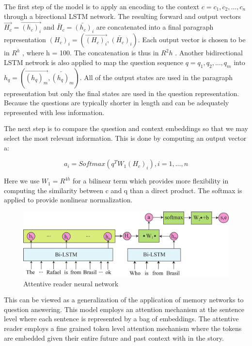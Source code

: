 \documentclass{article}
\begin{document}
The first step of the model is to apply an encoding
to the context $ c = {c_1 , c_2 , ..., c_n }$ through a birectional LSTM network. The resulting forward and output vectors $ \overrightarrow{H_c} =\overrightarrow{(h_c)_i}$ and $ \overleftarrow{H_c} = \overleftarrow{(h_c)_i} $ are concatenated into a final paragraph representation $(H_c)_i = ( \overrightarrow{(H_c)_i} , \overleftarrow{(H_c)_i} )$. Each output vector is chosen to be in $R^h$ , where h = 100. The concatenation is thus in $R^2h$ . Another bidirectional LSTM network is also applied to map the question sequence $q = {q_1 , q_2 , ..., q_m }$ into $h_q = ( \overrightarrow{(h_q)_m} , \overleftarrow{(h_q)_m} )$. All of the output states are used in the paragraph representation but only the final states are used in the question representation. Because the questions are typically shorter in length and can be adequately represented with less information.

The next step is to compare the question and context embeddings so that we may select the most
relevant information. This is done by computing an output vector a:

\begin{equation}
a_i = Softmax(q^TW_1(H_c)_i), i = 1,...,n
\end{equation}

Here we use $W_1 = R^{4h}$ for a bilinear term which provides more flexibility in computing the
similarity between c and q than a direct product. The softmax is applied to provide nonlinear normalization.

\begin{figure}
  \includegraphics[width=\linewidth]{reader.png}
  \caption{ Attentive reader neural network }
  \label{fig:reader}
\end{figure}

This can be viewed as a generalization of the application of memory networks to question answering. This model employs an attention mechanism at the sentence level where each sentence is represented by a bag of embeddings. The attentive reader employs a fine grained token level attention mechanism where the tokens are embedded given their entire future and past context with in the story.
\end{document}

